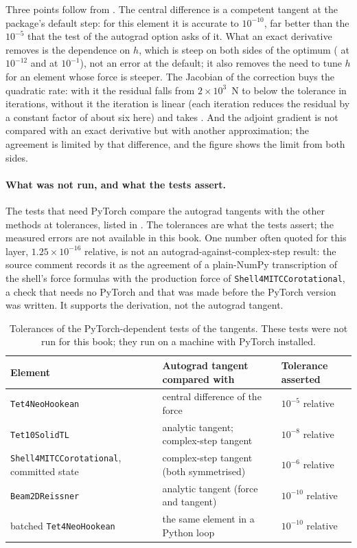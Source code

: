 Three points follow from . The central difference is a competent tangent at the package's default step: for this element it is accurate to $10^{-10}$, far better than the $10^{-5}$ that the test of the autograd option asks of it. What an exact derivative removes is the dependence on $h$, which is steep on both sides of the optimum (\adaFdAtSmall{} at $10^{-12}$ and \adaFdAtLarge{} at $10^{-1}$), not an error at the default; it also removes the need to tune $h$ for an element whose force is steeper. The Jacobian of the correction buys the quadratic rate: with it the residual falls from $2\times10^{3}$~N to below the tolerance in \adaItFull{} iterations, without it the iteration is linear (each iteration reduces the residual by a constant factor of about six here) and takes \adaItLazy. And the adjoint gradient is not compared with an exact derivative but with another approximation; the agreement is limited by that difference, and the figure shows the limit from both sides.

\paragraph{What was not run, and what the tests assert.} The tests that need PyTorch compare the autograd tangents with the other methods at tolerances, listed in . The tolerances are what the tests assert; the measured errors are not available in this book. One number often quoted for this layer, $1.25\times10^{-16}$ relative, is not an autograd-against-complex-step result: the source comment records it as the agreement of a plain-NumPy transcription of the shell's force formulas with the production force of \texttt{Shell4MITCCorotational}, a check that needs no PyTorch and that was made before the PyTorch version was written. It supports the derivation, not the autograd tangent.

\begin{table}[ht]
\centering\small
\begin{tabularx}{\linewidth}{@{}l X l@{}}
\toprule
Element & Autograd tangent compared with & Tolerance asserted \\
\midrule
\texttt{Tet4NeoHookean} & central difference of the force & $10^{-5}$ relative \\
\texttt{Tet10SolidTL} & analytic tangent; complex-step tangent & $10^{-8}$ relative \\
\texttt{Shell4MITCCorotational}, committed state & complex-step tangent (both symmetrised) & $10^{-6}$ relative \\
\texttt{Beam2DReissner} & analytic tangent (force and tangent) & $10^{-10}$ relative \\
batched \texttt{Tet4NeoHookean} & the same element in a Python loop & $10^{-10}$ relative \\
\bottomrule
\end{tabularx}
\caption{Tolerances of the PyTorch-dependent tests of the tangents. These tests were not run for this book; they run on a machine with PyTorch installed.}\label{tab:df-torch}
\end{table}

